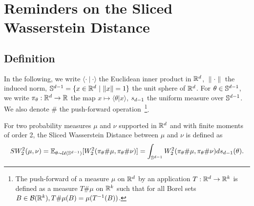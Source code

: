 

\section{Reminders on the Sliced Wasserstein Distance} \label{sec:reminderSW}






\subsection{Definition}\label{sec:def}
{In the following, we write $\langle \cdot \ | \ \cdot \rangle$ the Euclidean inner product in $\mathbb{R}^{d}$, $\|\cdot\|$ the induced norm, $\Sd = \{ x\in \Rd \ |\ \|x\| = 1\}$ the unit
sphere of $\mathbb{R}^d$.}
{For $\theta\in\mathbb{S}^{d-1}$, we write $\pi_{\theta}:\mathbb{R}^{d}
\rightarrow \mathbb{R}$ the map $x \mapsto \langle \theta|x \rangle$,
$s_{d-1}$ the uniform measure over $\mathbb{S}^{d-1}$. %
We also denote $\#$ the push-forward
operation}~\footnote{The push-forward of a measure  $\mu$ on $\mathbb{R}^d$ by
  an application $T: \mathbb{R}^d \rightarrow \mathbb{R}^k$ is defined as a measure
  $T\#\mu$ on $\mathbb{R}^k$ such that for all Borel sets $B \in
  \mathcal{B}(\mathbb{R}^k), T\#\mu(B) = \mu(T^{-1}(B))$.}.

For two probability measures $\mu$ and
$\nu$ supported in $\mathbb{R}^d$ {and with finite moments of order 2}, the Sliced Wasserstein
Distance between  $\mu$ and
$\nu$ is defined as
\begin{equation} \label{eq:SW}
SW_2^2(\mu,\nu)= \mathbb{E}_{\theta \sim \mathcal{U}(\mathbb{S}^{d-1})}[W_2^2(\pi_{\theta} \# \mu, \pi_{\theta} \# \nu)] = \displaystyle\int_{\mathbb{S}^{d-1}}W_2^2(\pi_{\theta} \# \mu, \pi_{\theta} \# \nu) ds_{d-1}(\theta).
\end{equation}

